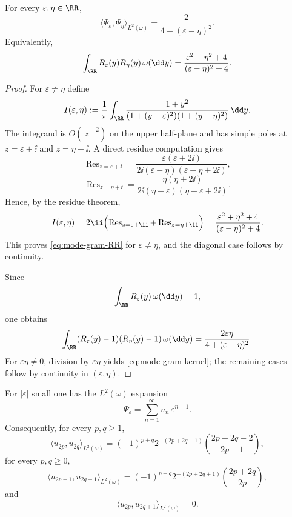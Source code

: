\begin{theorem}%
\label{thm:mode-gram-kernel}
For every $\varepsilon,\eta\in\RR$,
\begin{equation}\label{eq:mode-gram-kernel}
\langle \Psi_\varepsilon,\Psi_\eta\rangle_{L^2(\omega)}
=\frac{2}{4+(\varepsilon-\eta)^2}.
\end{equation}
Equivalently,
\begin{equation}\label{eq:mode-gram-RR}
\int_{\RR}R_\varepsilon(y)R_\eta(y)\,\omega(\dd y)
=\frac{\varepsilon^2+\eta^2+4}{(\varepsilon-\eta)^2+4}.
\end{equation}
\end{theorem}

\begin{proof}
For $\varepsilon\neq\eta$ define
\[
I(\varepsilon,\eta)
:=\frac{1}{\pi}\int_{\RR}
\frac{1+y^2}{(1+(y-\varepsilon)^2)(1+(y-\eta)^2)}\,\dd y.
\]
The integrand is $O(|z|^{-2})$ on the upper half-plane and has simple
poles at $z=\varepsilon+\ii$ and $z=\eta+\ii$.  A direct residue
computation gives
\[
\operatorname{Res}_{z=\varepsilon+\ii}
=\frac{\varepsilon(\varepsilon+2\ii)}
{2\ii(\varepsilon-\eta)(\varepsilon-\eta+2\ii)},
\]
\[
\operatorname{Res}_{z=\eta+\ii}
=\frac{\eta(\eta+2\ii)}
{2\ii(\eta-\varepsilon)(\eta-\varepsilon+2\ii)}.
\]
Hence, by the residue theorem,
\[
I(\varepsilon,\eta)
=2\ii\Bigl(
\operatorname{Res}_{z=\varepsilon+\ii}
+\operatorname{Res}_{z=\eta+\ii}
\Bigr)
=\frac{\varepsilon^2+\eta^2+4}{(\varepsilon-\eta)^2+4}.
\]
This proves \eqref{eq:mode-gram-RR} for $\varepsilon\neq\eta$, and the
diagonal case follows by continuity.

Since
\[
\int_{\RR}R_\varepsilon(y)\,\omega(\dd y)=1,
\]
one obtains
\[
\int_{\RR}(R_\varepsilon(y)-1)(R_\eta(y)-1)\,\omega(\dd y)
=\frac{2\varepsilon\eta}{4+(\varepsilon-\eta)^2}.
\]
For $\varepsilon\eta\neq 0$, division by $\varepsilon\eta$ yields
\eqref{eq:mode-gram-kernel}; the remaining cases follow by continuity in
$(\varepsilon,\eta)$.
\end{proof}

\begin{corollary}%
\label{cor:mode-quadratic-integrals}
For $|\varepsilon|$ small one has the $L^2(\omega)$ expansion
\[
\Psi_\varepsilon
=\sum_{n=1}^{\infty}u_n\,\varepsilon^{n-1}.
\]
Consequently, for every $p,q\ge 1$,
\[
\langle u_{2p},u_{2q}\rangle_{L^2(\omega)}
=(-1)^{p+q}2^{-(2p+2q-1)}
\binom{2p+2q-2}{2p-1},
\]
for every $p,q\ge 0$,
\[
\langle u_{2p+1},u_{2q+1}\rangle_{L^2(\omega)}
=(-1)^{p+q}2^{-(2p+2q+1)}
\binom{2p+2q}{2p},
\]
and
\[
\langle u_{2p},u_{2q+1}\rangle_{L^2(\omega)}=0.
\]
\end{corollary}

